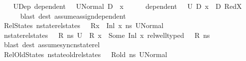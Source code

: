 \begin{isabellebody}
\ \ \isamarkupfalse%
\ U{}Dep{\isacharcolon}{\kern0pt}\ {\isachardoublequoteopen}dependent\ {\isasymLambda}{\isacharprime}{\kern0pt}\ {\isasymOmega}\ {\isacharquery}{\kern0pt}U{}Normal\ {\isacharparenleft}{\kern0pt}D{}\ {\isasymunion}\ {\isacharbraceleft}{\kern0pt}x{}{\isacharbraceright}{\kern0pt}{\isacharparenright}{\kern0pt}{\isachardoublequoteclose}\isanewline
\ \ \ \ \isamarkupfalse%
\ {\isacartoucheopen}dependent\ {\isasymLambda}{\isacharprime}{\kern0pt}\ {\isasymOmega}\ U{}\ D{}{\isacartoucheclose}\ {\isacartoucheopen}x{}\ {\isasymnotin}\ D{}{\isacartoucheclose}\ RedX{}\isanewline
\ \ \ \ \isamarkupfalse%
\ {\isacharparenleft}{\kern0pt}blast\ dest{\isacharcolon}{\kern0pt}\ assume{\isacharunderscore}{\kern0pt}assign{\isacharunderscore}{\kern0pt}dependent{\isacharparenright}{\kern0pt}\isanewline
\ \ \isamarkupfalse%
\ RelStates{\isacharcolon}{\kern0pt}\ {\isachardoublequoteopen}nstate{\isacharunderscore}{\kern0pt}rel{\isacharunderscore}{\kern0pt}states\ {\isasymLambda}\ {\isasymLambda}{\isacharprime}{\kern0pt}\ {\isacharparenleft}{\kern0pt}R{\isacharparenleft}{\kern0pt}x\ {\isasymmapsto}\ Inl\ x{}{\isacharparenright}{\kern0pt}{\isacharparenright}{\kern0pt}\ ns\ {\isacharquery}{\kern0pt}U{}Normal{\isachardoublequoteclose}\ \isanewline
\ \ \ \ \isamarkupfalse%
\ {\isacartoucheopen}nstate{\isacharunderscore}{\kern0pt}rel{\isacharunderscore}{\kern0pt}states\ {\isasymLambda}\ {\isasymLambda}{\isacharprime}{\kern0pt}\ R\ ns\ U{}{\isacartoucheclose}\ \ {\isacartoucheopen}R\ x\ {\isacharequal}{\kern0pt}\ Some\ {\isacharparenleft}{\kern0pt}Inl\ x{}{\isacharparenright}{\kern0pt}{\isacartoucheclose}\ {\isacartoucheopen}rel{\isacharunderscore}{\kern0pt}well{\isacharunderscore}{\kern0pt}typed\ {\isasymLambda}\ {\isasymOmega}\ R\ ns{\isacartoucheclose}\ \isamarkupfalse%
\ {\isacharparenleft}{\kern0pt}blast\ dest{\isacharcolon}{\kern0pt}\ assume{\isacharunderscore}{\kern0pt}sync{\isacharunderscore}{\kern0pt}nstate{\isacharunderscore}{\kern0pt}rel{\isacharparenright}{\kern0pt}\isanewline
\ \ \isamarkupfalse%
\ RelOldStates{\isacharcolon}{\kern0pt}\ {\isachardoublequoteopen}nstate{\isacharunderscore}{\kern0pt}old{\isacharunderscore}{\kern0pt}rel{\isacharunderscore}{\kern0pt}states\ {\isasymLambda}\ {\isasymLambda}{\isacharprime}{\kern0pt}\ R{\isacharunderscore}{\kern0pt}old\ ns\ {\isacharquery}{\kern0pt}U{}Normal{\isachardoublequoteclose}\ \isanewline

\end{isabellebody}
